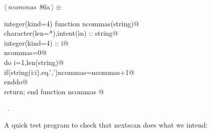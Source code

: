 \documentclass[10pt,a4paper,notitlepage]{article}
\begin{document}
\begin{flushleft} \small
\begin{minipage}{\linewidth}\label{scrap108}\raggedright\small
{} $\langle\,${\it ncommas}\nobreak\ {\footnotesize {86a}}$\,\rangle\equiv$
\vspace{-1ex}
\begin{list}{}{} \item
\mbox{}\verb@      integer(kind=4) function ncommas(string)@\\
\mbox{}\verb@      character(len=*),intent(in) :: string@\\
\mbox{}\verb@      integer(kind=4) :: i@\\
\mbox{}\verb@      ncommas=0@\\
\mbox{}\verb@      do i=1,len(string)@\\
\mbox{}\verb@        if(string(i:i).eq.',')ncommas=ncommas+1@\\
\mbox{}\verb@      enddo@\\
\mbox{}\verb@      return; end function ncommas                                         @{\NWsep}
\end{list}
\vspace{-1.5ex}
\footnotesize
\begin{list}{}{\setlength{\itemsep}{-\parsep}\setlength{\itemindent}{-\leftmargin}}
\item \NWtxtMacroRefIn\ .

\item{}
\end{list}
\end{minipage}\vspace{4ex}
\end{flushleft}
A quick test program to check that nextscan does what we intend:
\end{document}
